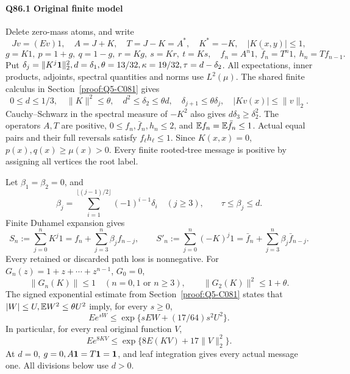 \paragraph{Q86.1 Original finite model}
Delete zero-mass atoms, and write
\[
Jv=(Ev)1,\quad A=J+K,\quad T=J-K=A^*,\quad K^*=-K,
\quad |K(x,y)|\le1,
\]
\[
g=K1,\ p=1+g,\ q=1-g,\ r=Kg,\ s=Kr,\ t=Ks,
\quad f_n=A^n1,\ \bar f_n=T^n1,\ h_n=T f_{n-1}.
\]
Put \(\delta_j=\allowbreak \|K^j\mathbf1\|_2^2,\allowbreak d=\allowbreak \delta_1,\allowbreak \theta=\allowbreak 13/32,\allowbreak \kappa=\allowbreak 19/32,\allowbreak \tau=\allowbreak d-\delta_2\).
All expectations, inner products, adjoints, spectral quantities and norms use \(L^2(\mu)\).
The shared finite calculus in Section~\ref{proof:Q5-C081} gives
\[
0\le d\le1/3,\quad \|K\|^2\le\theta,\quad
d^2\le \delta_2\le\theta d,\quad \delta_{j+1}\le\theta \delta_j,
\quad |Kv(x)|\le\|v\|_2.
\tag{Q86.1.1}\label{eq:Q86:1.1}
\]
Cauchy--Schwarz in the spectral measure of \(-K^2\) also gives
\(d\delta_3\ge\allowbreak \delta_2^2\).
The operators \(A,\allowbreak T\) are positive,
\(0\le\allowbreak  f_n,\allowbreak \bar f_n,\allowbreak h_n\le\allowbreak 2\), and \(\mathbb E f_n=\allowbreak \mathbb E\bar f_n\le\allowbreak 1\).
Actual equal pairs and their full reversals satisfy \(f_\ell h_\ell\le\allowbreak 1\).
Since \(K(x,\allowbreak x)=\allowbreak 0\), \(p(x),\allowbreak q(x)\ge\allowbreak \mu(x)>\allowbreak 0\).
Every finite rooted-tree message is positive by assigning all vertices the root label.

Let \(\beta_1=\allowbreak \beta_2=\allowbreak 0\), and
\[
\beta_j=\sum_{i=1}^{\lfloor(j-1)/2\rfloor}(-1)^{i-1}\delta_i
\quad(j\ge3),\qquad \tau\le\beta_j\le d.
\]
Finite Duhamel expansion gives
\[
S_n:=\sum_{j=0}^nK^j1
=f_n+\sum_{j=3}^n\beta_jf_{n-j},\qquad
S'_n:=\sum_{j=0}^n(-K)^j1
=\bar f_n+\sum_{j=3}^n\beta_j\bar f_{n-j}.
\tag{Q86.1.2}\label{eq:Q86:1.2}
\]
Every retained or discarded path loss is nonnegative.
For \(G_n(z)=\allowbreak 1+z+\cdots+z^{n-1}\), \(G_0=\allowbreak 0\),
\[
\|G_n(K)\|\le1\quad(n=0,1\text{ or }n\ge3),
\qquad\|G_2(K)\|^2\le1+\theta.
\tag{Q86.1.3}\label{eq:Q86:1.3}
\]
The signed exponential estimate from Section~\ref{proof:Q5-C081} states that
\(|W|\le\allowbreak  U,\allowbreak \mathbb E W^2\le\allowbreak \theta U^2\) imply, for every \(s\ge\allowbreak 0\),
\[
Ee^{sW}\le\exp\{sEW+(17/64)s^2U^2\}.
\]
In particular, for every real original function \(V\),
\[
\boxed{Ee^{8KV}\le\exp\{8E(KV)+17\|V\|_2^2\}.}
\tag{Q86.1.4}\label{eq:Q86:1.4}
\]
At \(d=\allowbreak 0\), \(g=\allowbreak 0,\allowbreak A\mathbf1=\allowbreak T\mathbf1=\allowbreak \mathbf1\), and leaf integration gives every actual message one.
All divisions below use \(d>\allowbreak 0\).

